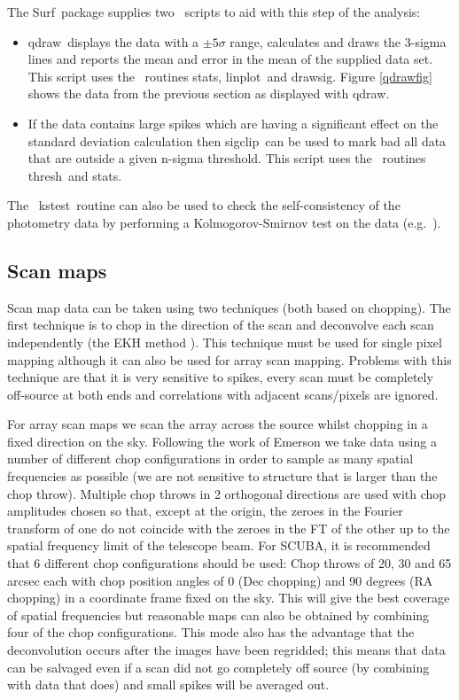 \documentclass[twoside,11pt]{article}
\newcommand{\scusoft}          {{\sc Surf}}
\newcommand{\Kappa}{\xref{{\sc{Kappa}}}{sun95}{}}
\newcommand{\task}[1]{{\sf #1}}
\newcommand{\qdraw}{\htmlref{\task{qdraw}}{QDRAW}}
\newcommand{\sigclip}{\htmlref{\task{sigclip}}{SIGCLIP}}
\newcommand{\linplot}{\xref{\task{linplot}}{sun95}{LINPLOT}}
\newcommand{\drawsig}{\xref{\task{drawsig}}{sun95}{DRAWSIG}}
\newcommand{\kstest}{\xref{\task{kstest}}{sun95}{KSTEST}}
\newcommand{\stats}{\xref{\task{stats}}{sun95}{STATS}}
\newcommand{\thresh}{\xref{\task{thresh}}{sun95}{THRESH}}
\newcommand{\htmlref}[2]{#1}
\newcommand{\xref}[3]{#1}
\renewcommand{\_}{\texttt{\symbol{95}}}
\begin{document}
The \scusoft\ package supplies two \Kappa\ scripts to aid with this step of
the analysis:

\begin{itemize}

\item  \qdraw\ displays the data with a $\pm 5\sigma$ range,
calculates and draws the 3-sigma lines and reports the mean and error in the
mean of the supplied data set. This script uses the \Kappa\ routines
\stats, \linplot\ and \drawsig. Figure \ref{qdrawfig}
shows the data from the previous section as displayed with \qdraw.

\item If the data contains large spikes which are having a significant effect
on the standard deviation calculation then \sigclip\ can be used to mark
bad all data that are outside a given n-sigma threshold. This script uses the
\Kappa\ routines \thresh\ and \stats.

\end{itemize}

The \Kappa\ \kstest\ routine can also be used to check the
self-consistency of the photometry data by performing a Kolmogorov-Smirnov
test on the data (e.g.\ \cite{dhh}).


\subsection{Scan maps}

Scan map data can be taken using two techniques (both based on chopping).  The
first technique is to chop in the direction of the scan and deconvolve each
scan independently (the EKH method \cite{ekh}).  This technique must be used
for single pixel mapping although it can also be used for array scan mapping.
Problems with this technique are that it is very sensitive to spikes, 
every scan must be completely off-source at both ends and correlations
with adjacent scans/pixels are ignored.

For array scan maps we scan the array across the source whilst chopping in a
fixed direction on the sky. Following the work of Emerson\cite{EII} we take
data using a number of different chop configurations in order to sample as
many spatial frequencies as possible (we are not sensitive to structure that
is larger than the chop throw). Multiple chop throws in 2 orthogonal
directions are used with chop amplitudes chosen so that, except at the origin,
the zeroes in the Fourier transform of one do not coincide with the zeroes in
the FT of the other up to the spatial frequency limit of the telescope
beam. For SCUBA, it is recommended that 6 different chop configurations should
be used: Chop throws of 20, 30 and 65 arcsec each with chop position angles of
0 (Dec chopping) and 90 degrees (RA chopping) in a coordinate frame fixed on
the sky. This will give the best coverage of spatial frequencies but reasonable
maps can also be obtained by combining four of the chop configurations.
This mode also has the advantage that the deconvolution occurs after the
images have been regridded; this means that data can be salvaged even if
a scan did not go completely off source (by combining with data that does)
and small spikes will be averaged out.
\end{document}
